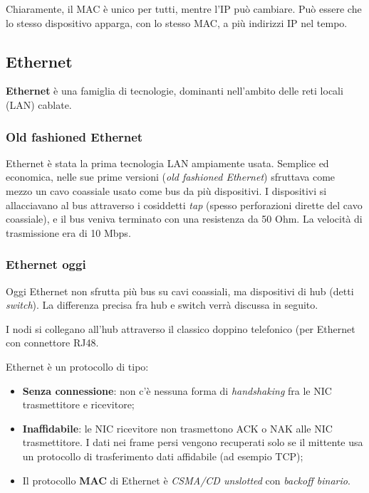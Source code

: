\documentclass[a4paper,11pt]{article}
\begin{document}
Chiaramente, il MAC è unico per tutti, mentre l'IP può cambiare. Può essere che lo stesso dispositivo apparga, con lo stesso MAC, a più indirizzi IP nel tempo.

\subsection{Ethernet}
\textbf{Ethernet} è una famiglia di tecnologie, dominanti nell'ambito delle reti locali (LAN) cablate.

\subsubsection{Old fashioned Ethernet}
Ethernet è stata la prima tecnologia LAN ampiamente usata. Semplice ed economica, nelle sue prime versioni (\textit{old fashioned Ethernet}) sfruttava come mezzo un cavo coassiale usato come bus da più dispositivi.
I dispositivi si allacciavano al bus attraverso i cosiddetti \textit{tap} (spesso perforazioni dirette del cavo coassiale), e il bus veniva terminato con una resistenza da 50 Ohm.
La velocità di trasmissione era di 10 Mbps.

\subsubsection{Ethernet oggi}
Oggi Ethernet non sfrutta più bus su cavi coassiali, ma dispositivi di hub (detti \textit{switch}). La differenza precisa fra hub e switch verrà discussa in seguito.

I nodi si collegano all'hub attraverso il classico doppino telefonico (per Ethernet con connettore RJ48.

\par\smallskip

Ethernet è un protocollo di tipo:
\begin{itemize}
	\item \textbf{Senza connessione}: non c'è nessuna forma di \textit{handshaking} fra le NIC trasmettitore e ricevitore;
	\item \textbf{Inaffidabile}: le NIC ricevitore non trasmettono ACK o NAK alle NIC trasmettitore. I dati nei frame persi vengono recuperati solo se il mittente usa un protocollo di trasferimento dati affidabile (ad esempio TCP);
	\item Il protocollo \textbf{MAC} di Ethernet è \textit{CSMA/CD unslotted} con \textit{backoff binario}.
\end{itemize}
\end{document}
